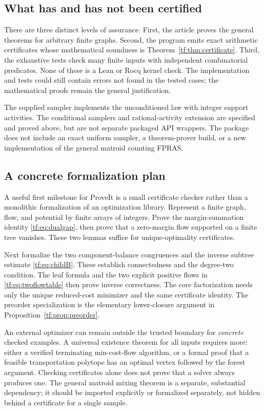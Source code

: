\documentclass[11pt]{article}
\numberwithin{equation}{section}
\theoremstyle{definition}
\begin{document}
\subsection{What has and has not been certified}
There are three distinct levels of assurance. First, the article proves
the general theorems for arbitrary finite graphs. Second, the program
emits exact arithmetic certificates whose mathematical soundness is
Theorem~\ref{tf:thm:certificate}. Third, the exhaustive tests check many
finite inputs with independent combinatorial predicates. None of these
is a Lean or Rocq kernel check. The implementation and tests could still
contain errors not found in the tested cases; the mathematical proofs
remain the general justification.

The supplied sampler implements the unconditioned law with integer
support activities. The conditional samplers and rational-activity
extension are specified and proved above, but are not separate packaged
API wrappers. The package does not include an exact uniform sampler,
a theorem-prover build, or a new implementation of the general matroid
counting FPRAS.

\subsection{A concrete formalization plan}
A useful first milestone for ProveIt is a small certificate checker rather
than a monolithic formalization of an optimization library. Represent a
finite graph, flow, and potential by finite arrays of integers. Prove the
margin-summation identity \eqref{tf:eq:dualgap}, then prove that a zero-margin
flow supported on a finite tree vanishes. These two lemmas suffice for
unique-optimality certificates.

Next formalize the two component-balance congruences and the inverse
subtree estimate \eqref{tf:eq:childB}. These establish connectedness and the
degree-two condition. The leaf formula and the two explicit positive
flows in \eqref{tf:eq:twoflowtable} then prove inverse correctness. The core
factorization needs only the unique reduced-cost minimizer and the same
certificate identity. The preorder specialization is the elementary
lower-closure argument in Proposition~\ref{tf:prop:preorder}.

An external optimizer can remain outside the trusted boundary for
\emph{concrete} checked examples. A universal existence theorem for all
inputs requires more: either a verified terminating min-cost-flow
algorithm, or a formal proof that a feasible transportation polytope has
an optimal vertex followed by the forest argument. Checking certificates
alone does not prove that a solver always produces one. The general
matroid mixing theorem is a separate, substantial dependency; it should
be imported explicitly or formalized separately, not hidden behind a
certificate for a single sample.
\end{document}

